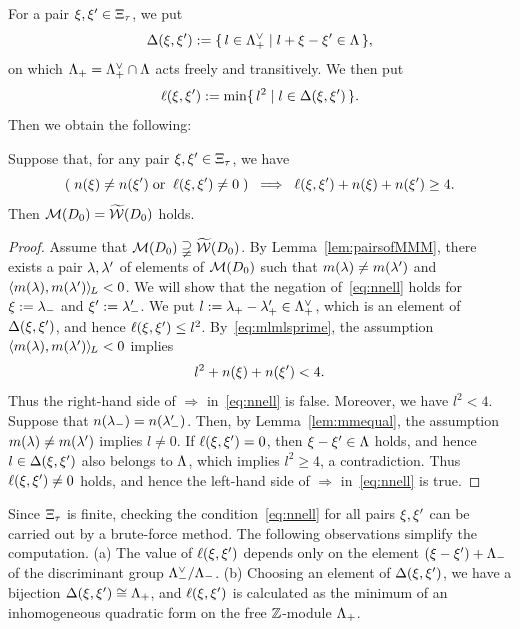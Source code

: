 \documentclass{amsart} %
\begin{document}
%
%
For a pair $\xi, \xi^{\prime}\in \Xi_{\tau}$,
we put
%
\begin{equation}\label{eq:diffellset}
\Delta(\xi, \xi^{\prime}):=
\{\,{l\in \Lambda_{+}^{\vee}}\mid {l+\xi-\xi^{\prime}\in \Lambda} \,\},
\end{equation}
%
on which $\Lambda_{+}= \Lambda_{+}^{\vee}\cap\Lambda$ acts freely and transitively.
We then put 
%
\begin{equation}\label{eq:diffell}
\ell(\xi, \xi^{\prime}):=\min\{\,{l^2}\mid {l\in \Delta(\xi, \xi^{\prime})} \,\}.
\end{equation}
%
Then we obtain the following:
%
\begin{lemma}\label{lem:MMMtilwalls}
Suppose that, for any pair $\xi, \xi^{\prime}\in \Xi_{\tau}$,
we have
%
\begin{equation}\label{eq:nnell}
(\;n(\xi)\ne n(\xi^{\prime}) \; \textrm{\rm or}\; \;\ell(\xi, \xi^{\prime})\ne 0 \;)\;\;\Longrightarrow\;\; \ell(\xi, \xi^{\prime})+n(\xi)+n(\xi^{\prime})\ge 4.
\end{equation}
%
Then $\mathord{\mathcal{M}}(D_0)=\widetilde{\mathord{\mathcal{W}}} (D_0)$ holds.
\end{lemma}
%
\begin{proof}
Assume that $\mathord{\mathcal{M}}(D_0)\supsetneqq\widetilde{\mathord{\mathcal{W}}} (D_0)$.
By Lemma~\ref{lem:pairsofMMM},
there exists a pair $\lambda, \lambda^{\prime}$ of elements of $ \mathord{\mathcal{M}}(D_0)$
such that $m(\lambda)\ne m(\lambda^{\prime})$ and $ \langle m(\lambda), m(\lambda^{\prime}) \rangle_{\hskip -1pt L} <0$.
We will show that the negation of~\eqref{eq:nnell} holds for
$\xi:={\lambda}_{-}$ and $\xi^{\prime}:={\lambda}_{-}^{\prime}$.
We put $l:={\lambda}_{+}-{\lambda}_{+}^{\prime}\in \Lambda_{+}^{\vee}$,
which is an element of $\Delta(\xi, \xi^{\prime})$,
and hence $\ell(\xi, \xi^{\prime})\le l^2$.
By~\eqref{eq:mlmlsprime},
the assumption $ \langle m(\lambda), m(\lambda^{\prime}) \rangle_{\hskip -1pt L} <0$ implies 
%
\begin{equation*}\label{eq:lnn}
l^2+n(\xi)+n(\xi^{\prime})<4.
\end{equation*}
%
Thus the right-hand side of $\Longrightarrow$ in~\eqref{eq:nnell} is false.
Moreover, we have $l^2<4$.
Suppose that $n({\lambda}_{-})=n({\lambda}_{-}^{\prime})$.
Then, by Lemma~\ref{lem:mmequal},
the assumption $m(\lambda)\ne m(\lambda^{\prime})$ implies $l\ne 0$.
If $\ell(\xi, \xi^{\prime})= 0$, then 
$\xi-\xi^{\prime}\in \Lambda$ holds, and hence 
$l\in \Delta(\xi, \xi^{\prime})$ also belongs to $\Lambda$,
which implies $l^2\ge 4$, a contradiction.
Thus $\ell(\xi, \xi^{\prime})\ne0$ holds, and hence the left-hand side of $\Longrightarrow$ in~\eqref{eq:nnell} is true.
\end{proof}
%
\begin{remark}\label{rem:MMMtilwalls}
Since $\Xi_{\tau}$ is finite,
checking the condition~\eqref{eq:nnell} for all pairs $\xi, \xi^{\prime}$
 can be carried out by a brute-force method.
The following observations simplify the computation.
(a) 
The value of $\ell(\xi, \xi^{\prime})$ depends only on the element $(\xi-\xi^{\prime})+\Lambda_{-}$
of the discriminant group $\Lambda_{-}^{\vee}/\Lambda_{-}$.
(b) 
Choosing an element of $\Delta(\xi, \xi^{\prime})$, 
we have a bijection $\Delta(\xi, \xi^{\prime})\cong \Lambda_{+}$,
and $\ell(\xi, \xi^{\prime})$ is calculated as the minimum of
an inhomogeneous quadratic form on the free $\mathord{\mathbb{Z}}$-module $\Lambda_{+}$.
\end{remark}
\end{document}
